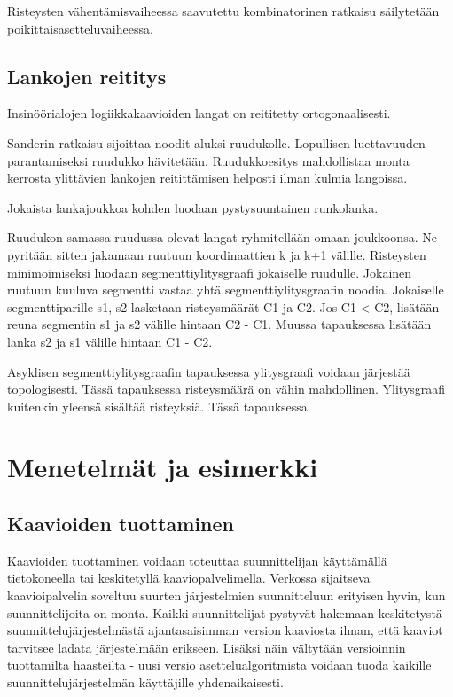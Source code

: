 \documentclass[finnish,12pt]{article}
\begin{document}
Risteysten vähentämisvaiheessa saavutettu kombinatorinen ratkaisu säilytetään poikittaisasetteluvaiheessa.

		\subsection{Lankojen reititys}

Insinöörialojen logiikkakaavioiden langat on reititetty ortogonaalisesti.

Sanderin ratkaisu sijoittaa noodit aluksi ruudukolle. Lopullisen luettavuuden parantamiseksi ruudukko hävitetään. Ruudukkoesitys mahdollistaa monta kerrosta ylittävien lankojen reitittämisen helposti ilman kulmia langoissa.
\cite{RefWorks:17}

Jokaista lankajoukkoa kohden luodaan pystysuuntainen runkolanka.

Ruudukon samassa ruudussa olevat langat ryhmitellään omaan joukkoonsa.
Ne pyritään sitten jakamaan ruutuun koordinaattien k ja k+1 välille.
Risteysten minimoimiseksi luodaan segmenttiylitysgraafi jokaiselle ruudulle. Jokainen ruutuun kuuluva segmentti vastaa yhtä segmenttiylitysgraafin noodia. Jokaiselle segmenttiparille s1, s2 lasketaan risteysmäärät C1 ja C2. Jos C1 < C2, lisätään reuna segmentin s1 ja s2 välille hintaan C2 - C1. Muussa tapauksessa lisätään lanka s2 ja s1 välille hintaan C1 - C2.

Asyklisen segmenttiylitysgraafin tapauksessa ylitysgraafi voidaan järjestää topologisesti. Tässä tapauksessa risteysmäärä on vähin mahdollinen. Ylitysgraafi kuitenkin yleensä sisältää risteyksiä. Tässä tapauksessa.

	\clearpage
	\section{Menetelmät ja esimerkki}

		\subsection{Kaavioiden tuottaminen}

Kaavioiden tuottaminen voidaan toteuttaa suunnittelijan käyttämällä tietokoneella tai keskitetyllä kaaviopalvelimella.
Verkossa sijaitseva kaavioipalvelin soveltuu suurten järjestelmien suunnitteluun erityisen hyvin, kun suunnittelijoita on monta. Kaikki suunnittelijat pystyvät hakemaan keskitetystä suunnittelujärjestelmästä ajantasaisimman version kaaviosta ilman, että kaaviot tarvitsee ladata järjestelmään erikseen.
Lisäksi näin vältytään versioinnin tuottamilta haasteilta - uusi versio asettelualgoritmista voidaan tuoda kaikille suunnittelujärjestelmän käyttäjille yhdenaikaisesti.
\end{document}
